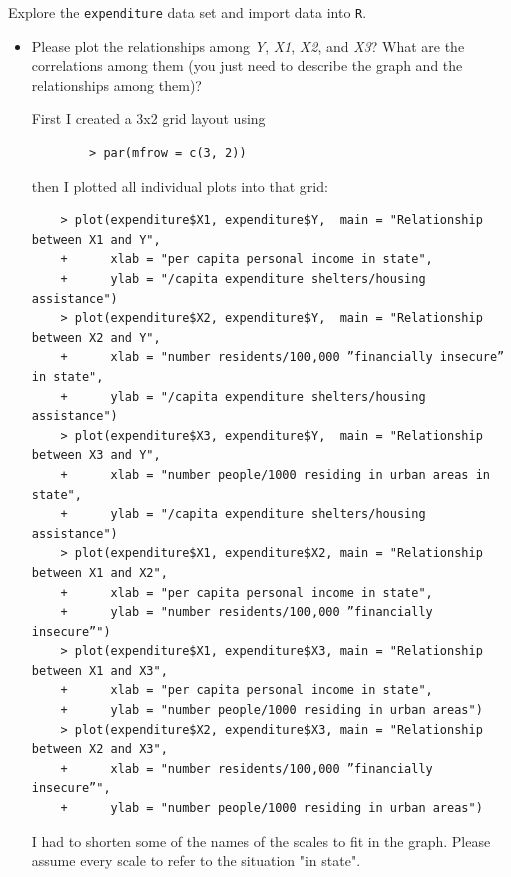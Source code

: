 \documentclass[12pt,letterpaper]{article}
\begin{document}
\vspace{.5cm}
\noindent Explore the \texttt{expenditure} data set and import data into \texttt{R}.
\vspace{.5cm}
  
\vspace{.5cm}
\begin{itemize}

\item
Please plot the relationships among \emph{Y}, \emph{X1}, \emph{X2}, and \emph{X3}? What are the correlations among them (you just need to describe the graph and the relationships among them)?


First I created a 3x2 grid layout using 
	\begin{verbatim}
		> par(mfrow = c(3, 2))
			\end{verbatim}
then I plotted all individual plots into that grid:
\begin{verbatim}
	> plot(expenditure$X1, expenditure$Y,  main = "Relationship between X1 and Y",  
	+      xlab = "per capita personal income in state", 
	+      ylab = "/capita expenditure shelters/housing assistance")
	> plot(expenditure$X2, expenditure$Y,  main = "Relationship between X2 and Y",  
	+      xlab = "number residents/100,000 ”financially insecure” in state", 
	+      ylab = "/capita expenditure shelters/housing assistance")
	> plot(expenditure$X3, expenditure$Y,  main = "Relationship between X3 and Y",  
	+      xlab = "number people/1000 residing in urban areas in state", 
	+      ylab = "/capita expenditure shelters/housing assistance")
	> plot(expenditure$X1, expenditure$X2, main = "Relationship between X1 and X2", 
	+      xlab = "per capita personal income in state", 
	+      ylab = "number residents/100,000 ”financially insecure”")
	> plot(expenditure$X1, expenditure$X3, main = "Relationship between X1 and X3", 
	+      xlab = "per capita personal income in state", 
	+      ylab = "number people/1000 residing in urban areas")
	> plot(expenditure$X2, expenditure$X3, main = "Relationship between X2 and X3", 
	+      xlab = "number residents/100,000 ”financially insecure”", 
	+      ylab = "number people/1000 residing in urban areas")
		\end{verbatim}
		
I had to shorten some of the names of the scales to fit in the graph. Please assume every scale to refer to the situation "in state".



\end{itemize}
\end{document}
